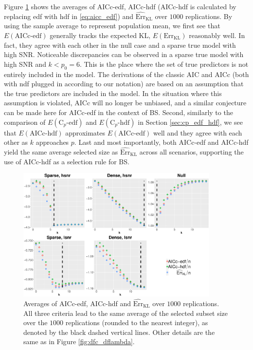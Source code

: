 Figure \ref{fig:eop_approx_withrss} shows the averages of AICc-edf, AICc-hdf (AICc-hdf is calculated by replacing edf with hdf in \eqref{eq:aicc_edf}) and $\widehat{\text{Err}}_{\text{KL}}$ over $1000$ replications. By using the sample average to represent population mean, we first see that $E(\text{AICc-edf})$ generally tracks the expected KL, $E(\text{Err}_{\text{KL}})$ reasonably well. In fact, they agree with each other in the null case and a sparse true model with high SNR. Noticeable discrepancies can be observed in a sparse true model with high SNR and $k<p_0=6$. This is the place where the set of true predictors is not entirely included in the model. The derivations of the classic AIC and AICc (both with ndf plugged in according to our notation) are based on an assumption that the true predictors are included in the model. In the situation where this assumption is violated, AICc will no longer be unbiased, and a similar conjecture can be made here for AICc-edf in the context of BS. Second, similarly to the comparison of $E(\text{C}_p\text{-edf})$ and $E(\text{C}_p\text{-hdf})$ in Section \ref{sec:cp_edf_hdf}, we see that $E(\text{AICc-hdf})$ approximates $E(\text{AICc-edf})$ well and they agree with each other as $k$ approaches $p$. 
Last and most importantly, both AICc-edf and AICc-hdf yield the same average selected size as $\widehat{\text{Err}}_{\text{KL}}$ across all scenarios, supporting the use of AICc-hdf as a selection rule for BS.

\begin{figure}[!ht]
	\centering
	\includegraphics[width=0.9\textwidth]{figures/aicc_edf_hdf_kl_bs.eps}
	\caption{Averages of AICc-edf, AICc-hdf and $\widehat{\text{Err}}_\text{KL}$ over $1000$ replications. All three criteria lead to the same average of the selected subset size over the $1000$ replications (rounded to the nearest integer), as denoted by the black dashed vertical lines. Other details are the same as in Figure \ref{fig:dfc_dflambda}.}
	\label{fig:eop_approx_withrss} 
\end{figure}

